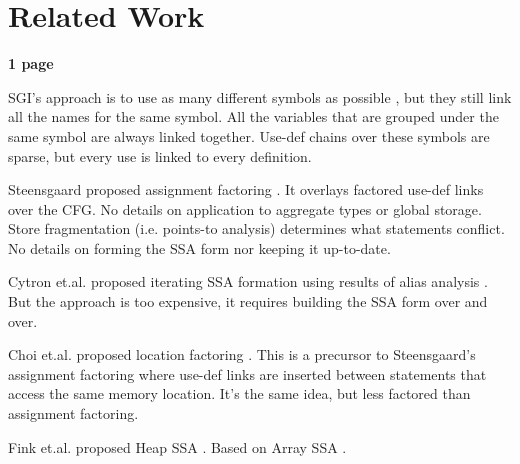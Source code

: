 \section{Related Work}

\textbf{1 page}

SGI's approach is to use as many different symbols as possible
\cite{bib:chow.ea-96}, but they still link all the names for the
same symbol.  All the variables that are grouped under the same
symbol are always linked together.  Use-def chains over these
symbols are sparse, but every use is linked to every definition.

Steensgaard proposed assignment factoring
\cite{bib:steensgaard-95}.  It overlays factored use-def links
over the CFG.  No details on application to aggregate types or
global storage.  Store fragmentation (i.e. points-to analysis)
determines what statements conflict.  No details on forming the
SSA form nor keeping it up-to-date.

Cytron et.al. proposed iterating SSA formation using results of alias
analysis \cite{bib:cytron.ea-93}.  But the approach is too
expensive, it requires building the SSA form over and over.

Choi et.al. proposed location factoring \cite{bib:choi.ea-94}.
This is a precursor to Steensgaard's assignment factoring where
use-def links are inserted between statements that access the
same memory location.  It's the same idea, but less factored than
assignment factoring.

Fink et.al. proposed Heap SSA \cite{bib:fink.ea-00}.  Based on Array SSA
\cite{bib:knobe.ea-98}.
